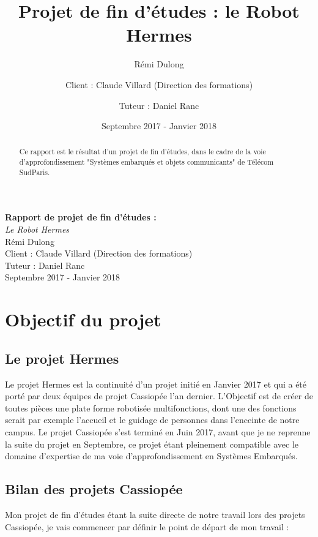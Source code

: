 \documentclass{report}
\title{Projet de fin d'études : le Robot Hermes}
\author{Rémi Dulong \and{Client : Claude Villard (Direction des formations)}
\and{Tuteur : Daniel Ranc}}
\date{Septembre 2017 - Janvier 2018}
\begin{document}
\begin{titlepage}
  \centering
  \vfill
  {\bfseries \Huge
      Rapport de projet de fin d'études : \\
  }
  {\huge
      \textit{Le Robot Hermes}\\
      Rémi Dulong\\
      Client : Claude Villard (Direction des formations)\\
      Tuteur : Daniel Ranc\\
      \vskip2cm
      Septembre 2017 - Janvier 2018\\
  }
  \vfill

  \vfill
  \vfill
\end{titlepage}

  \newpage

  \begin{abstract}
      {Ce rapport est le résultat d'un projet de fin d'études, dans le cadre de
       la voie d'approfondissement "Systèmes embarqués et objets communicants"
       de Télécom SudParis.}
  \end{abstract}

  \tableofcontents
  \newpage

\chapter{Objectif du projet}

  \section{Le projet Hermes}

    {Le projet Hermes est la continuité d'un projet initié en Janvier 2017 et
    qui a été porté par deux équipes de projet Cassiopée l'an dernier. L'Objectif
    est de créer de toutes pièces une plate forme robotisée multifonctions, dont
    une des fonctions serait par exemple l'accueil et le guidage de personnes dans
    l'enceinte de notre campus. Le projet Cassiopée s'est terminé en Juin 2017,
    avant que je ne reprenne la suite du projet en Septembre, ce projet étant pleinement
    compatible avec le domaine d'expertise de ma voie d'approfondissement en
    Systèmes Embarqués.}

    \section{Bilan des projets Cassiopée}

    {Mon projet de fin d'études étant la suite directe de notre travail lors des
     projets Cassiopée, je vais commencer par définir le point de départ de mon travail :}
\end{document}
